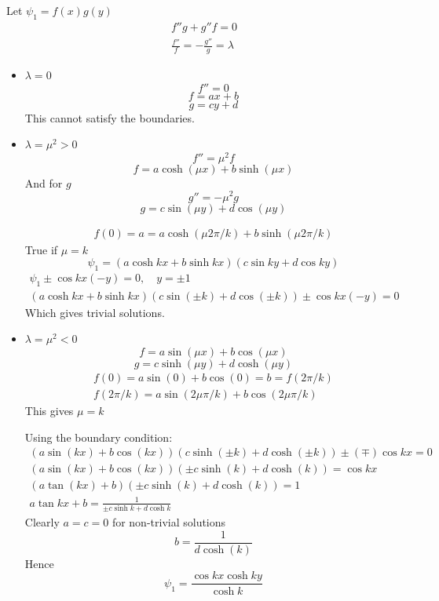 \documentclass{/home/janmebows/Documents/LatexTemplates/myassignment}
\begin{document}
\begin{enumerate}
\begin{enumerate}
        
        Let $\psi_1 = f(x)g(y)$
        \begin{align*}
            f''g + g''f = 0\\
            \frac{f''}f =- \frac{g''}g = \lambda
        \end{align*}
        \begin{itemize}
            \item $\lambda = 0$
            \[f'' = 0\]
            \[f = ax + b\]
            \[g = cy + d\]
            This cannot satisfy the boundaries.

            \item $\lambda=\mu^2 > 0$ 
            \[f'' = \mu^2 f\]
            \[f = a\cosh(\mu x) + b \sinh(\mu x)\]
            And for $g$
            \[g'' = - \mu^2 g\]
            \[g = c\sin(\mu y) + d \cos(\mu y)\]

            \begin{align*}
                f(0) = a = a\cosh(\mu 2\pi/k) + b\sinh(\mu 2\pi /k)
            \end{align*}
            True if $\mu =k$
            \[\psi_1 = (a\cosh kx + b\sinh kx)(c\sin ky + d\cos ky)\]
            \begin{align*}
            \psi_{1} \pm \cos kx (-y) = 0, \quad y=\pm 1\\
            (a\cosh kx + b\sinh kx)(c\sin(\pm k) + d\cos(\pm k)) \pm \cos kx (-y) = 0
            \end{align*}
            Which gives trivial solutions.


            \item $\lambda =\mu^2 < 0$
            \[f = a\sin(\mu x) + b\cos(\mu x)\]
            \[g = c\sinh(\mu y) + d\cosh(\mu y)\]
            \begin{align*}
                f(0) =a\sin(0) + b\cos(0) =  b = f(2\pi/k)\\
                f(2\pi/k)= a\sin(2\mu \pi/k) + b\cos(2\mu \pi/k) 
            \end{align*}
            This gives $\mu = k$

            Using the boundary condition:
            \begin{align*}
                (a\sin(k x) + b\cos(k x))(c\sinh(\pm k) + d\cosh(\pm k)) \pm (\mp)\cos kx = 0\\
                (a\sin(k x) + b\cos(k x))(\pm c\sinh(k) + d\cosh(k)) =\cos kx \\
                (a\tan(k x) + b)(\pm c\sinh(k) + d\cosh(k)) =1\\
                a\tan kx + b = \frac{1}{\pm c\sinh k + d\cosh k}
            \end{align*}
            Clearly $a=c=0$ for non-trivial solutions
            \[b = \frac{1}{d\cosh(k)}\]
            Hence
            \[\boxed{\psi_1 = \frac{\cos kx \cosh ky}{\cosh k}}\]


\end{itemize}
\end{enumerate}
\end{enumerate}
\end{document}
